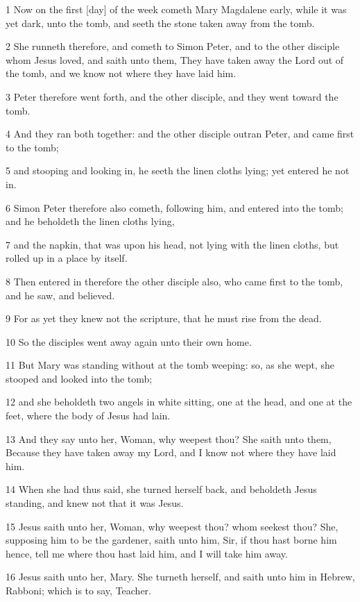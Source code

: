\par 1 Now on the first [day] of the week cometh Mary Magdalene early, while it was yet dark, unto the tomb, and seeth the stone taken away from the tomb.
\par 2 She runneth therefore, and cometh to Simon Peter, and to the other disciple whom Jesus loved, and saith unto them, They have taken away the Lord out of the tomb, and we know not where they have laid him.
\par 3 Peter therefore went forth, and the other disciple, and they went toward the tomb.
\par 4 And they ran both together: and the other disciple outran Peter, and came first to the tomb;
\par 5 and stooping and looking in, he seeth the linen cloths lying; yet entered he not in.
\par 6 Simon Peter therefore also cometh, following him, and entered into the tomb; and he beholdeth the linen cloths lying,
\par 7 and the napkin, that was upon his head, not lying with the linen cloths, but rolled up in a place by itself.
\par 8 Then entered in therefore the other disciple also, who came first to the tomb, and he saw, and believed.
\par 9 For as yet they knew not the scripture, that he must rise from the dead.
\par 10 So the disciples went away again unto their own home.
\par 11 But Mary was standing without at the tomb weeping: so, as she wept, she stooped and looked into the tomb;
\par 12 and she beholdeth two angels in white sitting, one at the head, and one at the feet, where the body of Jesus had lain.
\par 13 And they say unto her, Woman, why weepest thou? She saith unto them, Because they have taken away my Lord, and I know not where they have laid him.
\par 14 When she had thus said, she turned herself back, and beholdeth Jesus standing, and knew not that it was Jesus.
\par 15 Jesus saith unto her, Woman, why weepest thou? whom seekest thou? She, supposing him to be the gardener, saith unto him, Sir, if thou hast borne him hence, tell me where thou hast laid him, and I will take him away.
\par 16 Jesus saith unto her, Mary. She turneth herself, and saith unto him in Hebrew, Rabboni; which is to say, Teacher.
